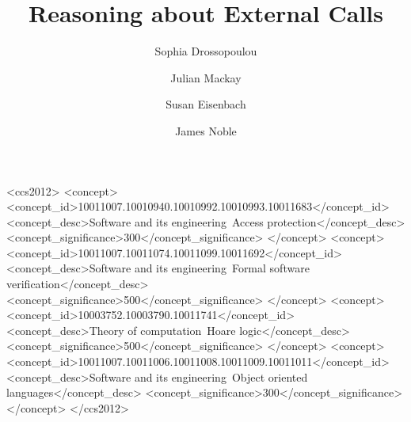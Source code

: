 \documentclass[acmsmall]{acmart}
\begin{document}
\title{Reasoning about External Calls}

\author{Sophia Drossopoulou}

\author{Julian Mackay}

\author{Susan Eisenbach}


\author{James Noble}






  

\begin{CCSXML}
<ccs2012>
   <concept>
       <concept_id>10011007.10010940.10010992.10010993.10011683</concept_id>
       <concept_desc>Software and its engineering~Access protection</concept_desc>
       <concept_significance>300</concept_significance>
       </concept>
   <concept>
       <concept_id>10011007.10011074.10011099.10011692</concept_id>
       <concept_desc>Software and its engineering~Formal software verification</concept_desc>
       <concept_significance>500</concept_significance>
       </concept>
   <concept>
       <concept_id>10003752.10003790.10011741</concept_id>
       <concept_desc>Theory of computation~Hoare logic</concept_desc>
       <concept_significance>500</concept_significance>
       </concept>
   <concept>
       <concept_id>10011007.10011006.10011008.10011009.10011011</concept_id>
       <concept_desc>Software and its engineering~Object oriented languages</concept_desc>
       <concept_significance>300</concept_significance>
       </concept>
 </ccs2012>
\end{CCSXML}
\end{document}
